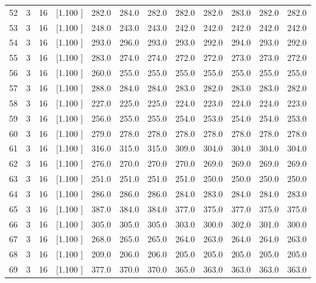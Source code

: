 \documentclass[12pt,a4paper]{article}
\begin{document}
\begin{center}
{\begin{tabular}{r r r r r r r r r r r r}
  52&  3& 16&[1.100     ]&   282.0&   284.0&   282.0&   282.0&   282.0&   283.0&   282.0&   282.0\\[-0.02in]
  53&  3& 16&[1.100     ]&   248.0&   243.0&   243.0&   242.0&   242.0&   242.0&   242.0&   242.0\\[-0.02in]
  54&  3& 16&[1.100     ]&   293.0&   296.0&   293.0&   293.0&   292.0&   294.0&   293.0&   292.0\\[-0.02in]
  55&  3& 16&[1.100     ]&   283.0&   274.0&   274.0&   272.0&   272.0&   273.0&   273.0&   272.0\\[-0.02in]
  56&  3& 16&[1.100     ]&   260.0&   255.0&   255.0&   255.0&   255.0&   255.0&   255.0&   255.0\\[-0.02in]
  57&  3& 16&[1.100     ]&   288.0&   284.0&   284.0&   283.0&   282.0&   283.0&   283.0&   282.0\\[-0.02in]
  58&  3& 16&[1.100     ]&   227.0&   225.0&   225.0&   224.0&   223.0&   224.0&   224.0&   223.0\\[-0.02in]
  59&  3& 16&[1.100     ]&   256.0&   255.0&   255.0&   254.0&   253.0&   254.0&   254.0&   253.0\\[-0.02in]
  60&  3& 16&[1.100     ]&   279.0&   278.0&   278.0&   278.0&   278.0&   278.0&   278.0&   278.0\\[-0.02in]
  61&  3& 16&[1.100     ]&   316.0&   315.0&   315.0&   309.0&   304.0&   304.0&   304.0&   304.0\\[-0.02in]
  62&  3& 16&[1.100     ]&   276.0&   270.0&   270.0&   270.0&   269.0&   269.0&   269.0&   269.0\\[-0.02in]
  63&  3& 16&[1.100     ]&   251.0&   251.0&   251.0&   251.0&   250.0&   250.0&   250.0&   250.0\\[-0.02in]
  64&  3& 16&[1.100     ]&   286.0&   286.0&   286.0&   284.0&   283.0&   284.0&   284.0&   283.0\\[-0.02in]
  65&  3& 16&[1.100     ]&   387.0&   384.0&   384.0&   377.0&   375.0&   377.0&   375.0&   375.0\\[-0.02in]
  66&  3& 16&[1.100     ]&   305.0&   305.0&   305.0&   303.0&   300.0&   302.0&   301.0&   300.0\\[-0.02in]
  67&  3& 16&[1.100     ]&   268.0&   265.0&   265.0&   264.0&   263.0&   264.0&   264.0&   263.0\\[-0.02in]
  68&  3& 16&[1.100     ]&   209.0&   206.0&   206.0&   205.0&   205.0&   205.0&   205.0&   205.0\\[-0.02in]
  69&  3& 16&[1.100     ]&   377.0&   370.0&   370.0&   365.0&   363.0&   363.0&   363.0&   363.0\\[-0.02in]

\end{tabular}}
\end{center}
\end{document}
